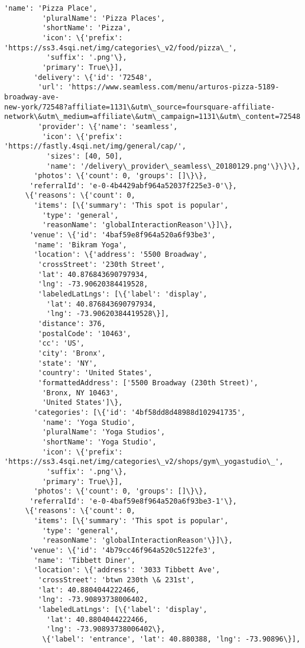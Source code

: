\documentclass[11pt]{article}
\begin{document}
\begin{tcolorbox}[breakable, size=fbox, boxrule=.5pt, pad at break*=1mm, opacityfill=0]
\begin{Verbatim}[commandchars=\\\{\}]
         'name': 'Pizza Place',
         'pluralName': 'Pizza Places',
         'shortName': 'Pizza',
         'icon': \{'prefix':
'https://ss3.4sqi.net/img/categories\_v2/food/pizza\_',
          'suffix': '.png'\},
         'primary': True\}],
       'delivery': \{'id': '72548',
        'url': 'https://www.seamless.com/menu/arturos-pizza-5189-broadway-ave-
new-york/72548?affiliate=1131\&utm\_source=foursquare-affiliate-
network\&utm\_medium=affiliate\&utm\_campaign=1131\&utm\_content=72548',
        'provider': \{'name': 'seamless',
         'icon': \{'prefix': 'https://fastly.4sqi.net/img/general/cap/',
          'sizes': [40, 50],
          'name': '/delivery\_provider\_seamless\_20180129.png'\}\}\},
       'photos': \{'count': 0, 'groups': []\}\},
      'referralId': 'e-0-4b4429abf964a52037f225e3-0'\},
     \{'reasons': \{'count': 0,
       'items': [\{'summary': 'This spot is popular',
         'type': 'general',
         'reasonName': 'globalInteractionReason'\}]\},
      'venue': \{'id': '4baf59e8f964a520a6f93be3',
       'name': 'Bikram Yoga',
       'location': \{'address': '5500 Broadway',
        'crossStreet': '230th Street',
        'lat': 40.876843690797934,
        'lng': -73.90620384419528,
        'labeledLatLngs': [\{'label': 'display',
          'lat': 40.876843690797934,
          'lng': -73.90620384419528\}],
        'distance': 376,
        'postalCode': '10463',
        'cc': 'US',
        'city': 'Bronx',
        'state': 'NY',
        'country': 'United States',
        'formattedAddress': ['5500 Broadway (230th Street)',
         'Bronx, NY 10463',
         'United States']\},
       'categories': [\{'id': '4bf58dd8d48988d102941735',
         'name': 'Yoga Studio',
         'pluralName': 'Yoga Studios',
         'shortName': 'Yoga Studio',
         'icon': \{'prefix':
'https://ss3.4sqi.net/img/categories\_v2/shops/gym\_yogastudio\_',
          'suffix': '.png'\},
         'primary': True\}],
       'photos': \{'count': 0, 'groups': []\}\},
      'referralId': 'e-0-4baf59e8f964a520a6f93be3-1'\},
     \{'reasons': \{'count': 0,
       'items': [\{'summary': 'This spot is popular',
         'type': 'general',
         'reasonName': 'globalInteractionReason'\}]\},
      'venue': \{'id': '4b79cc46f964a520c5122fe3',
       'name': 'Tibbett Diner',
       'location': \{'address': '3033 Tibbett Ave',
        'crossStreet': 'btwn 230th \& 231st',
        'lat': 40.8804044222466,
        'lng': -73.90893738006402,
        'labeledLatLngs': [\{'label': 'display',
          'lat': 40.8804044222466,
          'lng': -73.90893738006402\},
         \{'label': 'entrance', 'lat': 40.880388, 'lng': -73.90896\}],

\end{Verbatim}
\end{tcolorbox}
\end{document}
